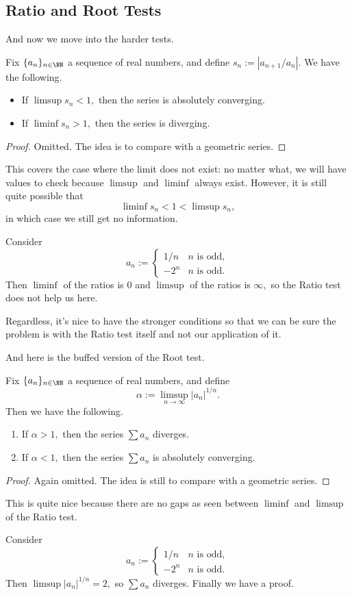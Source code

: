 \documentclass[../notes.tex]{subfiles}
\begin{document}
\subsection{Ratio and Root Tests}
And now we move into the harder tests.
\begin{prop}
	Fix $\{a_n\}_{n\in\NN}$ a sequence of real numbers, and define $s_n:=|a_{n+1}/a_n|.$ We have the following.
	\begin{itemize}
		\item If $\limsup s_n<1,$ then the series is absolutely converging.
		\item If $\liminf s_n>1,$ then the series is diverging.
	\end{itemize}
\end{prop}
\begin{proof}
	Omitted. The idea is to compare with a geometric series.
\end{proof}
This covers the case where the limit does not exist: no matter what, we will have values to check because $\limsup$ and $\liminf$ always exist. However, it is still quite possible that
\[\liminf s_n<1<\limsup s_n,\]
in which case we still get no information.
\begin{nex}
	Consider
	\[a_n:=\begin{cases}
		1/n & n\text{ is odd}, \\
		-2^n & n\text{ is odd}.
	\end{cases}\]
	Then $\liminf$ of the ratios is $0$ and $\limsup$ of the ratios is $\infty,$ so the Ratio test does not help us here.
\end{nex}
Regardless, it's nice to have the stronger conditions so that we can be sure the problem is with the Ratio test itself and not our application of it.

And here is the buffed version of the Root test.
\begin{prop}
	Fix $\{a_n\}_{n\in\NN}$ a sequence of real numbers, and define
	\[\alpha:=\limsup_{n\to\infty}|a_n|^{1/n}.\]
	Then we have the following.
	\begin{enumerate}[label=(\alph*)]
		\item If $\alpha>1,$ then the series $\sum a_n$ diverges.
		\item If $\alpha<1,$ then the series $\sum a_n$ is absolutely converging.
	\end{enumerate}
\end{prop}
\begin{proof}
	Again omitted. The idea is still to compare with a geometric series.
\end{proof}
This is quite nice because there are no gaps as seen between $\liminf$ and $\limsup$ of the Ratio test.
\begin{example}
	Consider
	\[a_n:=\begin{cases}
		1/n & n\text{ is odd}, \\
		-2^n & n\text{ is odd}.
	\end{cases}\]
	Then $\limsup|a_n|^{1/n}=2,$ so $\sum a_n$ diverges. Finally we have a proof.
\end{example}
\end{document}

